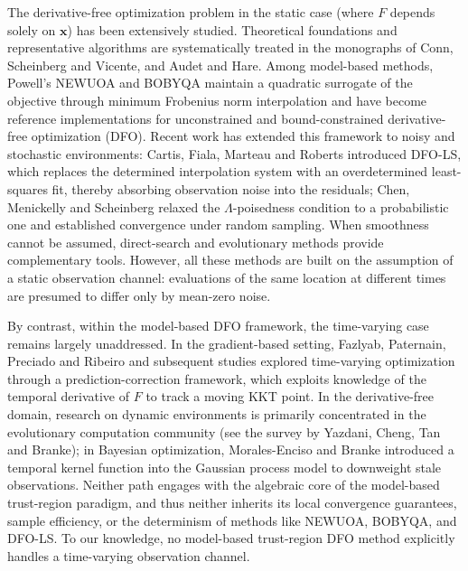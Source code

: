 \documentclass[11pt,a4paper]{article}
\begin{document}
The derivative-free optimization problem in the static case (where $F$ depends solely on $\bm{x}$) has been extensively studied. Theoretical foundations and representative algorithms are systematically treated in the monographs of Conn, Scheinberg and Vicente, and Audet and Hare. Among model-based methods, Powell's NEWUOA and BOBYQA maintain a quadratic surrogate of the objective through minimum Frobenius norm interpolation and have become reference implementations for unconstrained and bound-constrained derivative-free optimization (DFO). Recent work has extended this framework to noisy and stochastic environments: Cartis, Fiala, Marteau and Roberts introduced DFO-LS, which replaces the determined interpolation system with an overdetermined least-squares fit, thereby absorbing observation noise into the residuals; Chen, Menickelly and Scheinberg relaxed the $\Lambda$-poisedness condition to a probabilistic one and established convergence under random sampling. When smoothness cannot be assumed, direct-search and evolutionary methods provide complementary tools. However, all these methods are built on the assumption of a static observation channel: evaluations of the same location at different times are presumed to differ only by mean-zero noise.

By contrast, within the model-based DFO framework, the time-varying case remains largely unaddressed. In the gradient-based setting, Fazlyab, Paternain, Preciado and Ribeiro and subsequent studies explored time-varying optimization through a prediction-correction framework, which exploits knowledge of the temporal derivative of $F$ to track a moving KKT point. In the derivative-free domain, research on dynamic environments is primarily concentrated in the evolutionary computation community (see the survey by Yazdani, Cheng, Tan and Branke); in Bayesian optimization, Morales-Enciso and Branke introduced a temporal kernel function into the Gaussian process model to downweight stale observations. Neither path engages with the algebraic core of the model-based trust-region paradigm, and thus neither inherits its local convergence guarantees, sample efficiency, or the determinism of methods like NEWUOA, BOBYQA, and DFO-LS. To our knowledge, no model-based trust-region DFO method explicitly handles a time-varying observation channel.
\end{document}
